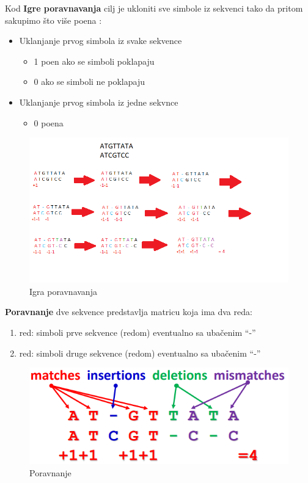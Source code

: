 Kod \textbf{Igre poravnavanja} cilj je ukloniti sve simbole iz
sekvenci tako da pritom sakupimo što više poena :
\begin{itemize}
    \item Uklanjanje prvog simbola iz svake sekvence
        \begin{itemize}
            \item 1 poen ako se simboli poklapaju
            \item 0 ako se simboli ne poklapaju
        \end{itemize}
    \item Uklanjanje prvog simbola iz jedne sekvnce
         \begin{itemize}
            \item 0 poena
        \end{itemize}
\end{itemize}

\begin{figure}[h]
\centering
\includegraphics[width=\textwidth]{poglavlja/5/slike/igraPoravnavanja.png}
\caption{Igra poravnavanja}
\end{figure} 


\textbf{Poravnanje} dve sekvence predstavlja matricu koja ima dva reda:

\begin{enumerate}
    \item red: simboli prve sekvence (redom) eventualno sa ubačenim “-” 
    \item red: simboli druge sekvence (redom) eventualno sa ubačenim “-” 
\end{enumerate}
\begin{figure}[h]
\centering
\includegraphics[width=\textwidth]{poglavlja/5/slike/poravnanje.png}
\caption{Poravnanje}
\label{slika:poravnavanje}
\end{figure} 

